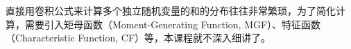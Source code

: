 
\begin{frame}

{
\large
直接用卷积公式来计算多个独立随机变量的和的分布往往非常繁琐，为了简化计算，需要引入矩母函数（Moment-Generating Function, MGF）、特征函数（Characteristic Function, CF）等，本课程就不深入细讲了。
}

\end{frame}












